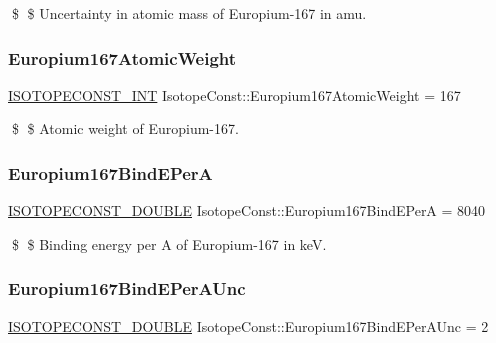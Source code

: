 \$ \$ Uncertainty in atomic mass of Europium-\/167 in amu. \mbox{\label{group___isotope_const-_europium-_eu167_ga33f1de98c8043e1efa4af791f0e192b8}} 
\subsubsection{\texorpdfstring{Europium167\+Atomic\+Weight}{Europium167AtomicWeight}}
{\footnotesize\ttfamily \mbox{\hyperlink{group___isotope_const-_macros_ga5f18360b3e99483a35c32d789e62621c}{I\+S\+O\+T\+O\+P\+E\+C\+O\+N\+S\+T\+\_\+\+I\+NT}} Isotope\+Const\+::\+Europium167\+Atomic\+Weight = 167}

\$ \$ Atomic weight of Europium-\/167. \mbox{\label{group___isotope_const-_europium-_eu167_ga1725f08ddbb18b434dd937ce3feb93fa}} 
\subsubsection{\texorpdfstring{Europium167\+Bind\+E\+PerA}{Europium167BindEPerA}}
{\footnotesize\ttfamily \mbox{\hyperlink{group___isotope_const-_macros_ga8f45a7272ce02c0b4c65c44636ed719a}{I\+S\+O\+T\+O\+P\+E\+C\+O\+N\+S\+T\+\_\+\+D\+O\+U\+B\+LE}} Isotope\+Const\+::\+Europium167\+Bind\+E\+PerA = 8040}

\$ \$ Binding energy per A of Europium-\/167 in keV. \mbox{\label{group___isotope_const-_europium-_eu167_gad9ed911c7dbdfb795d33a43683ae9b0d}} 
\subsubsection{\texorpdfstring{Europium167\+Bind\+E\+Per\+A\+Unc}{Europium167BindEPerAUnc}}
{\footnotesize\ttfamily \mbox{\hyperlink{group___isotope_const-_macros_ga8f45a7272ce02c0b4c65c44636ed719a}{I\+S\+O\+T\+O\+P\+E\+C\+O\+N\+S\+T\+\_\+\+D\+O\+U\+B\+LE}} Isotope\+Const\+::\+Europium167\+Bind\+E\+Per\+A\+Unc = 2}

